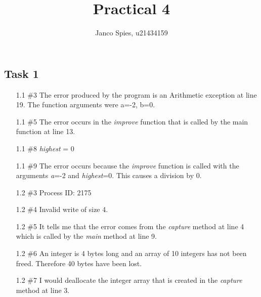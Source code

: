 \documentclass{article}
\begin{document}
\title{Practical 4}
\author{Janco Spies, u21434159}
\maketitle
\subsection*{Task 1}
\begin{itemize}
    \item[1.1 \#3]The error produced by the program is an Arithmetic exception at line 19. The function arguments were a=-2, b=0.
    \item[1.1 \#5]The error occurs in the \textit{improve} function that is called by the main function at line 13.
    \item[1.1 \#8]\textit{highest} = 0
    \item[1.1 \#9]The error occurs because the \textit{improve} function is called with the arguments \textit{a}=-2 and \textit{highest}=0. This causes a division by 0. 
\end{itemize}
\begin{itemize}
    \item[1.2 \#3]Process ID: 2175
    \item[1.2 \#4]Invalid write of size 4.
    \item[1.2 \#5]It tells me that the error comes from the \textit{capture} method at line 4 which is called by the \textit{main} method at line 9.
    \item[1.2 \#6]An integer is 4 bytes long and an array of 10 integers has not been freed. Therefore 40 bytes have been lost.
    \item[1.2 \#7]I would deallocate the integer array that is created in the \textit{capture} method at line 3.
\end{itemize}
\end{document}

